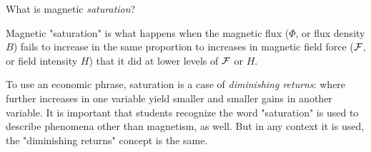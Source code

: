 

What is magnetic {\it saturation}?







Magnetic "saturation" is what happens when the magnetic flux ($\Phi$, or flux density $B$) fails to increase in the same proportion to increases in magnetic field force (${\cal F}$, or field intensity $H$) that it did at lower levels of $\cal F$ or $H$.







To use an economic phrase, saturation is a case of {\it diminishing returns}: where further increases in one variable yield smaller and smaller gains in another variable.  It is important that students recognize the word "saturation" is used to describe phenomena other than magnetism, as well.  But in any context it is used, the "diminishing returns" concept is the same.



